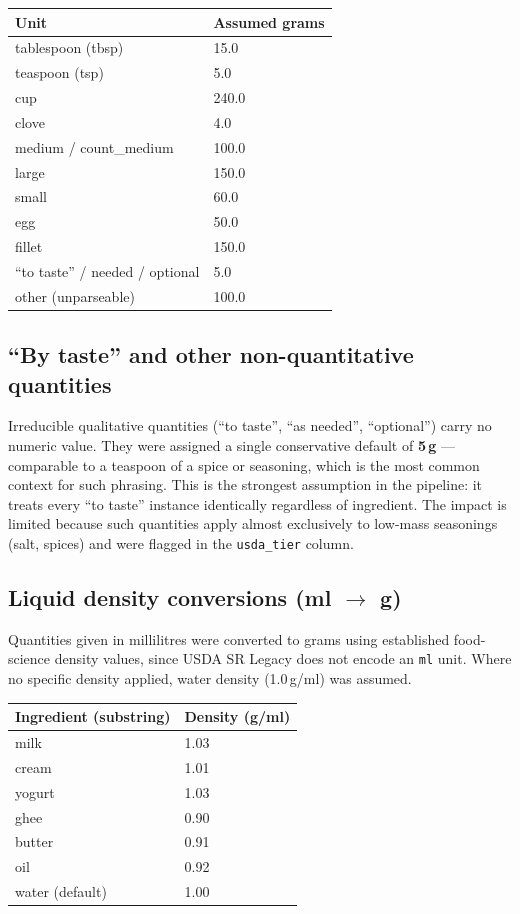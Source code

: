 \documentclass{article}
\begin{document}
\begin{center}
\begin{tabular}{ll}
\hline
\textbf{Unit} & \textbf{Assumed grams} \\
\hline
tablespoon (tbsp) & 15.0 \\
teaspoon (tsp) & 5.0 \\
cup & 240.0 \\
clove & 4.0 \\
medium / count\_medium & 100.0 \\
large & 150.0 \\
small & 60.0 \\
egg & 50.0 \\
fillet & 150.0 \\
``to taste'' / needed / optional & 5.0 \\
other (unparseable) & 100.0 \\
\hline
\end{tabular}
\end{center}

\subsection{``By taste'' and other non-quantitative quantities}

Irreducible qualitative quantities (``to taste'', ``as needed'', ``optional'') carry no numeric value. They were assigned a single conservative default of \textbf{5\,g} --- comparable to a teaspoon of a spice or seasoning, which is the most common context for such phrasing. This is the strongest assumption in the pipeline: it treats every ``to taste'' instance identically regardless of ingredient. The impact is limited because such quantities apply almost exclusively to low-mass seasonings (salt, spices) and were flagged in the \texttt{usda\_tier} column.

\subsection{Liquid density conversions (ml $\rightarrow$ g)}

Quantities given in millilitres were converted to grams using established food-science density values, since USDA SR Legacy does not encode an \texttt{ml} unit. Where no specific density applied, water density (1.0\,g/ml) was assumed.

\begin{center}
\begin{tabular}{ll}
\hline
\textbf{Ingredient (substring)} & \textbf{Density (g/ml)} \\
\hline
milk & 1.03 \\
cream & 1.01 \\
yogurt & 1.03 \\
ghee & 0.90 \\
butter & 0.91 \\
oil & 0.92 \\
water (default) & 1.00 \\
\hline
\end{tabular}
\end{center}
\end{document}
